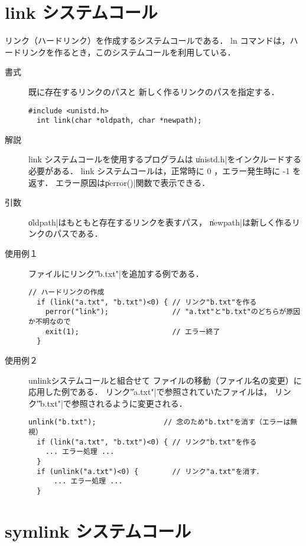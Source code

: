 \section{link システムコール}
リンク（ハードリンク）を作成するシステムコールである．
ln コマンドは，ハードリンクを作るとき，このシステムコールを利用している．

\begin{description}
\item[書式] 既に存在するリンクのパスと
新しく作るリンクのパスを指定する．
\begin{lstlisting}[numbers=none]
  #include <unistd.h>
  int link(char *oldpath, char *newpath);
\end{lstlisting}

\item[解説] link システムコールを使用するプログラムは
\|unistd.h|をインクルードする必要がある．
link システムコールは，正常時に 0 ，エラー発生時に -1 を返す．
エラー原因は\|perror()|関数で表示できる．

\item[引数] \|oldpath|はもともと存在するリンクを表すパス，
  \|newpath|は新しく作るリンクのパスである．

\item[使用例１] ファイルにリンク\|"b.txt"|を追加する例である．
\begin{lstlisting}[numbers=none]
  // ハードリンクの作成
  if (link("a.txt", "b.txt")<0) { // リンク"b.txt"を作る
    perror("link");               // "a.txt"と"b.txt"のどちらが原因か不明なので
    exit(1);                      // エラー終了
  }
\end{lstlisting}

\item[使用例２]unlinkシステムコールと組合せて
ファイルの移動（ファイル名の変更）に応用した例である．
リンク\|"a.txt"|で参照されていたファイルは，
リンク\|"b.txt"|で参照されるように変更される．
\begin{lstlisting}[numbers=none]
  unlink("b.txt");                // 念のため"b.txt"を消す（エラーは無視）
  if (link("a.txt", "b.txt")<0) { // リンク"b.txt"を作る
    ... エラー処理 ... 
  }
  if (unlink("a.txt")<0) {        // リンク"a.txt"を消す．
      ... エラー処理 ... 
  }
\end{lstlisting}
\end{description}

\section{symlink システムコール}

